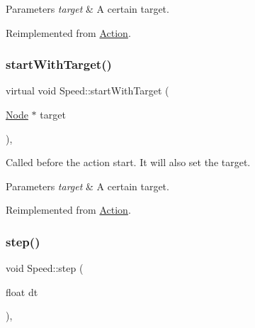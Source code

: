 \begin{DoxyParams}{Parameters}
{\em target} & A certain target. \\
\hline
\end{DoxyParams}


Reimplemented from \hyperlink{classAction_a5457090e4a035c6283777c893a9a681b}{Action}.

\mbox{\label{classSpeed_a09fda22493c3b5d8367f7b935168dfbb}} 
\subsubsection{\texorpdfstring{start\+With\+Target()}{startWithTarget()}\hspace{0.1cm}{\footnotesize\ttfamily [2/2]}}
{\footnotesize\ttfamily virtual void Speed\+::start\+With\+Target (\begin{DoxyParamCaption}\item[{\hyperlink{classNode}{Node} $\ast$}]{target }\end{DoxyParamCaption})\hspace{0.3cm}{\ttfamily [override]}, {\ttfamily [virtual]}}

Called before the action start. It will also set the target.


\begin{DoxyParams}{Parameters}
{\em target} & A certain target. \\
\hline
\end{DoxyParams}


Reimplemented from \hyperlink{classAction_a5457090e4a035c6283777c893a9a681b}{Action}.

\mbox{\label{classSpeed_a971cac28a44053f2011871529dac49a1}} 
\subsubsection{\texorpdfstring{step()}{step()}\hspace{0.1cm}{\footnotesize\ttfamily [1/2]}}
{\footnotesize\ttfamily void Speed\+::step (\begin{DoxyParamCaption}\item[{float}]{dt }\end{DoxyParamCaption})\hspace{0.3cm}{\ttfamily [override]}, {\ttfamily [virtual]}}


